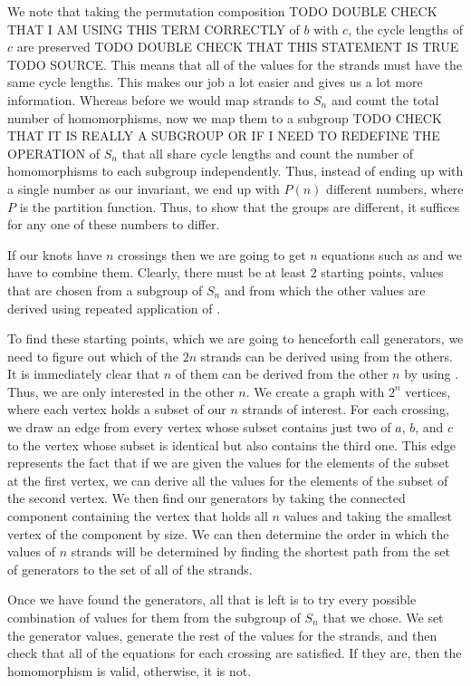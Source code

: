 \begin{paper}

We note that taking the permutation composition TODO DOUBLE CHECK THAT I AM
USING THIS TERM CORRECTLY of $b$ with $c$, the cycle lengths of $c$ are
preserved TODO DOUBLE CHECK THAT THIS STATEMENT IS TRUE TODO SOURCE.
This means that all of the values for the strands must have the same cycle
lengths.
This makes our job a lot easier and gives us a lot more information.
Whereas before we would map strands to $S_n$ and count the total number of
homomorphisms, now we map them to a subgroup TODO CHECK THAT IT IS REALLY A
SUBGROUP OR IF I NEED TO REDEFINE THE OPERATION of $S_n$ that all share cycle
lengths and count the number of homomorphisms to each subgroup independently.
Thus, instead of ending up with a single number as our invariant, we end up with
$P(n)$ different numbers, where $P$ is the partition function.
Thus, to show that the groups are different, it suffices for any one of these
numbers to differ.

If our knots have $n$ crossings then we are going to get $n$ equations such as
\eqBoth and we have to combine them.
Clearly, there must be at least 2 starting points, values that are chosen from a
subgroup of $S_n$ and from which the other values are derived using repeated
application of \eqBoth.

To find these starting points, which we are going to henceforth call generators,
we need to figure out which of the $2n$ strands can be derived using \eqBoth
from the others.
It is immediately clear that $n$ of them can be derived from the other $n$ by
using \eqUpper.
Thus, we are only interested in the other $n$.
We create a graph with $2^n$ vertices, where each vertex holds a subset of our
$n$ strands of interest.
For each crossing, we draw an edge from every vertex whose subset contains just
two of $a$, $b$, and $c$ to the vertex whose subset is identical but also
contains the third one.
This edge represents the fact that if we are given the values for the elements
of the subset at the first vertex, we can derive all the values for the elements
of the subset of the second vertex.
We then find our generators by taking the connected component containing the
vertex that holds all $n$ values and taking the smallest vertex of the component
by size.
We can then determine the order in which the values of $n$ strands will be
determined by finding the shortest path from the set of generators to the set of
all of the strands.

Once we have found the generators, all that is left is to try every possible
combination of values for them from the subgroup of $S_n$ that we chose.
We set the generator values, generate the rest of the values for the strands,
and then check that all of the equations for each crossing are satisfied.
If they are, then the homomorphism is valid, otherwise, it is not.




\end{paper}

